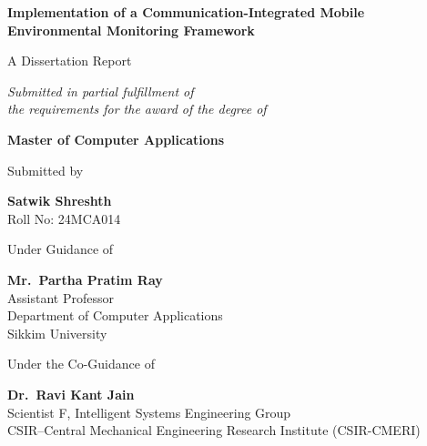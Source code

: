 \documentclass[12pt,a4paper,oneside]{report}
\begin{document}
\renewcommand\bibname{References}

\begin{titlepage}
\begin{center}

{\Large\bfseries Implementation of a Communication-Integrated Mobile\\[0.2cm]
Environmental Monitoring Framework}

\vspace{0.5cm}

{\large A Dissertation Report}

\vspace{0.3cm}

{\itshape Submitted in partial fulfillment of\\[0.2cm]
the requirements for the award of the degree of}

\vspace{0.3cm}

{\large\bfseries Master of Computer Applications}

\vspace{0.5cm}

{\large Submitted by}

\vspace{0.1cm}

{\large\bfseries Satwik Shreshth}\\[0.2cm]
{\normalsize Roll No: 24MCA014}

\vspace{0.5cm}

{\normalsize Under Guidance of}

\vspace{0.1cm}

{\normalsize\bfseries Mr.\ Partha Pratim Ray}\\[0.2cm]
{\normalsize Assistant Professor}\\[0.1cm]
{\normalsize Department of Computer Applications}\\[0.1cm]
{\normalsize Sikkim University}

\vspace{0.4cm}

{\normalsize Under the Co-Guidance of}

\vspace{0.001cm}

{\normalsize\bfseries Dr.\ Ravi Kant Jain}\\[0.2cm]
{\normalsize Scientist F, Intelligent Systems Engineering Group}\\[0.1cm]
{\normalsize CSIR--Central Mechanical Engineering Research Institute (CSIR-CMERI)}


\end{center}
\end{titlepage}
\end{document}
